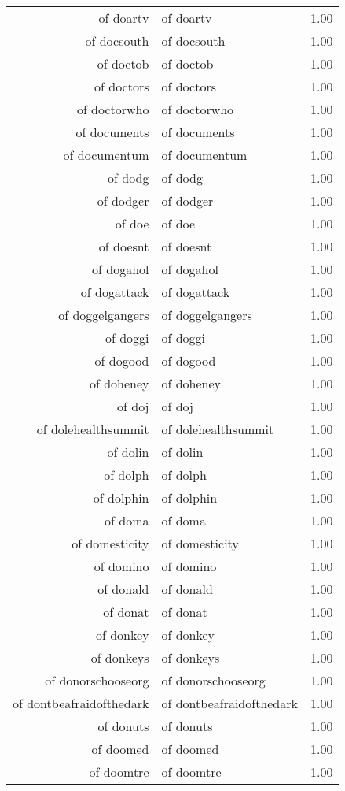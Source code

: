 \begin{table}[ht]
\begin{tabular}{rlr}
  of doartv & of doartv & 1.00 \\ 
  of docsouth & of docsouth & 1.00 \\ 
  of doctob & of doctob & 1.00 \\ 
  of doctors & of doctors & 1.00 \\ 
  of doctorwho & of doctorwho & 1.00 \\ 
  of documents & of documents & 1.00 \\ 
  of documentum & of documentum & 1.00 \\ 
  of dodg & of dodg & 1.00 \\ 
  of dodger & of dodger & 1.00 \\ 
  of doe & of doe & 1.00 \\ 
  of doesnt & of doesnt & 1.00 \\ 
  of dogahol & of dogahol & 1.00 \\ 
  of dogattack & of dogattack & 1.00 \\ 
  of doggelgangers & of doggelgangers & 1.00 \\ 
  of doggi & of doggi & 1.00 \\ 
  of dogood & of dogood & 1.00 \\ 
  of doheney & of doheney & 1.00 \\ 
  of doj & of doj & 1.00 \\ 
  of dolehealthsummit & of dolehealthsummit & 1.00 \\ 
  of dolin & of dolin & 1.00 \\ 
  of dolph & of dolph & 1.00 \\ 
  of dolphin & of dolphin & 1.00 \\ 
  of doma & of doma & 1.00 \\ 
  of domesticity & of domesticity & 1.00 \\ 
  of domino & of domino & 1.00 \\ 
  of donald & of donald & 1.00 \\ 
  of donat & of donat & 1.00 \\ 
  of donkey & of donkey & 1.00 \\ 
  of donkeys & of donkeys & 1.00 \\ 
  of donorschooseorg & of donorschooseorg & 1.00 \\ 
  of dontbeafraidofthedark & of dontbeafraidofthedark & 1.00 \\ 
  of donuts & of donuts & 1.00 \\ 
  of doomed & of doomed & 1.00 \\ 
  of doomtre & of doomtre & 1.00 \\ 

\end{tabular}
\end{table}
